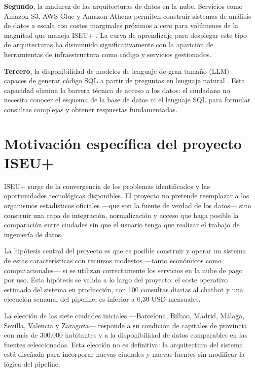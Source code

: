 \textbf{Segundo}, la madurez de las arquitecturas de datos en la nube. Servicios como Amazon S3, AWS Glue y Amazon Athena permiten construir sistemas de análisis de datos a escala con costes marginales próximos a cero para volúmenes de la magnitud que maneja ISEU+ \parencite{Armbrust2010CloudComputing}. La curva de aprendizaje para desplegar este tipo de arquitecturas ha disminuido significativamente con la aparición de herramientas de infraestructura como código y servicios gestionados.

\textbf{Tercero}, la disponibilidad de modelos de lenguaje de gran tamaño (LLM) capaces de generar código SQL a partir de preguntas en lenguaje natural \parencite{Guo2019Towards}. Esta capacidad elimina la barrera técnica de acceso a los datos: el ciudadano no necesita conocer el esquema de la base de datos ni el lenguaje SQL para formular consultas complejas y obtener respuestas fundamentadas.

\section{Motivación específica del proyecto ISEU+}

ISEU+ surge de la convergencia de los problemas identificados y las oportunidades tecnológicas disponibles. El proyecto no pretende reemplazar a los organismos estadísticos oficiales —que son la fuente de verdad de los datos— sino construir una capa de integración, normalización y acceso que haga posible la comparación entre ciudades sin que el usuario tenga que realizar el trabajo de ingeniería de datos.

La hipótesis central del proyecto es que es posible construir y operar un sistema de estas características con recursos modestos —tanto económicos como computacionales— si se utilizan correctamente los servicios en la nube de pago por uso. Esta hipótesis se valida a lo largo del proyecto: el coste operativo estimado del sistema en producción, con 100 consultas diarias al chatbot y una ejecución semanal del pipeline, es inferior a 0{,}30 USD mensuales.

La elección de las siete ciudades iniciales —Barcelona, Bilbao, Madrid, Málaga, Sevilla, Valencia y Zaragoza— responde a su condición de capitales de provincia con más de 300.000 habitantes y a la disponibilidad de datos comparables en las fuentes seleccionadas. Esta elección no es definitiva: la arquitectura del sistema está diseñada para incorporar nuevas ciudades y nuevas fuentes sin modificar la lógica del pipeline.


